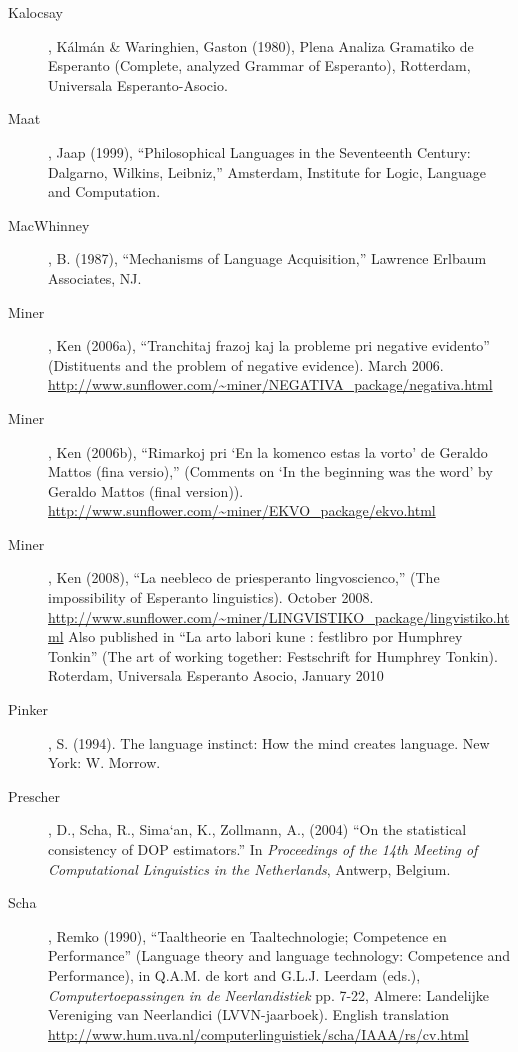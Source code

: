 \documentclass[10pt,a4paper]{article}
\begin{document}
\begin{description}
\item[Kalocsay], Kálmán \& Waringhien, Gaston (1980), Plena Analiza Gramatiko de
Esperanto (Complete, analyzed Grammar of Esperanto), Rotterdam, Universala
Esperanto-Asocio.

\item[Maat], Jaap (1999), ``Philosophical Languages in the Seventeenth Century:
Dalgarno, Wilkins, Leibniz,'' Amsterdam, Institute for Logic, Language and
Computation.

\item[MacWhinney], B. (1987), ``Mechanisms of Language Acquisition,'' Lawrence Erlbaum Associates, NJ.

\item[Miner], Ken (2006a), ``Tranchitaj frazoj kaj la probleme pri negative
evidento'' (Distituents and the problem of negative evidence). March 2006.
\url{http://www.sunflower.com/~miner/NEGATIVA_package/negativa.html}

\item[Miner], Ken (2006b), ``Rimarkoj pri `En la komenco estas la vorto' de Geraldo
Mattos (fina versio),'' (Comments on `In the beginning was the word' by Geraldo
Mattos (final version)). \url{http://www.sunflower.com/~miner/EKVO_package/ekvo.html}

\item[Miner], Ken (2008), ``La neebleco de priesperanto lingvoscienco,'' (The
impossibility of Esperanto linguistics). October 2008.
\url{http://www.sunflower.com/~miner/LINGVISTIKO_package/lingvistiko.html}
Also published in ``La arto labori kune : festlibro por Humphrey Tonkin'' (The
art of working together: Festschrift for Humphrey Tonkin). Roterdam, Universala
Esperanto Asocio, January 2010

\item[Pinker], S. (1994). The language instinct: How the mind creates language. New York: W. Morrow.

\item[Prescher], D., Scha, R., Sima`an, K., Zollmann, A., (2004) ``On the statistical
consistency of DOP estimators.'' In {\em Proceedings of the 14th Meeting of
Computational Linguistics in the Netherlands}, Antwerp, Belgium.

\item[Scha], Remko (1990), ``Taaltheorie en Taaltechnologie; Competence en
Performance'' (Language theory and language technology: Competence and
Performance), in Q.A.M. de kort and G.L.J. Leerdam (eds.), {\em Computertoepassingen in de Neerlandistiek} pp. 7-22, Almere: Landelijke
Vereniging van Neerlandici (LVVN-jaarboek). English translation
\url{http://www.hum.uva.nl/computerlinguistiek/scha/IAAA/rs/cv.html}


\end{description}
\end{document}
